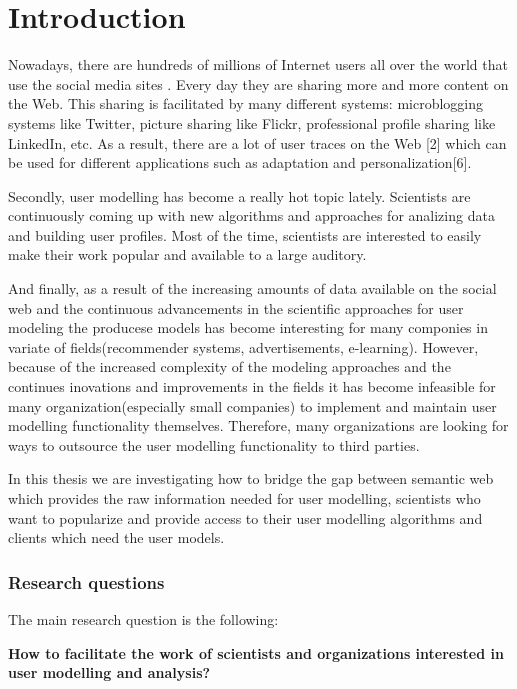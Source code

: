 
\chapter{\label{cha:intro}Introduction}

Nowadays, there are hundreds of millions of Internet users all over the world that use the social media sites \cite{On social Web sites}. Every day they are sharing more and more content on the Web. This sharing is facilitated by many different systems: microblogging systems like Twitter, picture sharing like Flickr, professional profile sharing like LinkedIn, etc. As a result, there are a lot of user traces on the Web [2] which can be used for different applications such as adaptation and personalization[6].

Secondly, user modelling has become a really hot topic lately. Scientists are continuously coming up with new algorithms and approaches for analizing data and building user profiles. Most of the time, scientists are interested to easily make their work popular and available to a large auditory.


And finally, as a result of the increasing amounts of data available on the social web and the continuous advancements in the scientific approaches for user modeling the producese models has become interesting for many componies in variate of fields(recommender systems, advertisements, e-learning). However, because of the increased complexity of the modeling approaches and the continues inovations and improvements in the fields it has become infeasible for many organization(especially small companies) to implement and maintain user modelling functionality themselves. Therefore, many organizations are looking for ways to outsource the user modelling functionality to third parties.


In this thesis we are investigating how to bridge the gap between semantic web which provides the raw information needed for user modelling, scientists who want to popularize and provide access to their user modelling algorithms and clients which need the user models. 


\subsection{Research questions}

The main research question is the following:

\textbf{How to facilitate the work of scientists and organizations interested in user modelling and analysis?}\\

